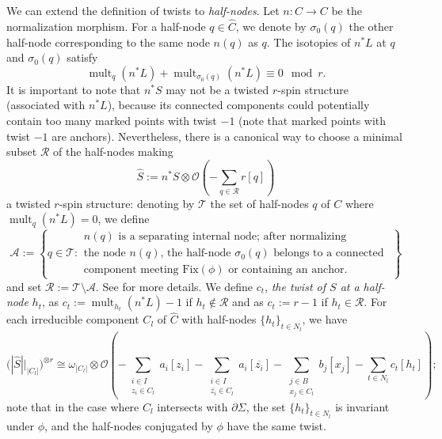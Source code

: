 \documentclass[11pt,a4paper]{article}
\theoremstyle{definition}
\theoremstyle{remark}
\numberwithin{equation}{section}
\begin{document}
We can extend the definition of twists to \textit{half-nodes}. Let $n: \widehat{C} \to C$ be the normalization morphism. For a half-node $q\in \widehat{C}$, we denote by $\sigma_0(q)$ the other half-node corresponding to the same node $n(q)$ as $q$. The isotopies of $n^*L$ at $q$ and $\sigma_0(q)$ satisfy $$\operatorname{mult}_{q}(n^*L)+\operatorname{mult}_{\sigma_0(q)}(n^*L)\equiv0 \mod r.$$ It is important to note that $n^*S$ may not be a twisted $r$-spin structure (associated with $n^*L$), because its connected components could potentially contain too many marked points with twist $-1$ (note that marked points with twist $-1$ are anchors).  Nevertheless, there is a canonical way to choose a minimal subset $\mathcal{R}$ of the half-nodes making
\begin{equation}
\label{eq normalize S}
\widehat{S}:= n^* S \otimes {\mathcal{O}}\left(-\sum_{q \in \mathcal{R}} r [q]\right)
\end{equation}
a twisted $r$-spin structure: denoting by $\mathcal T$ the set of half-nodes $q$ of $C$ where $\operatorname{mult}_{q}(n^*L)=0$, we define
\begin{equation*}
\mathcal A:= \left\{q \in \mathcal T\colon 
\begin{array}{ccc}
    \text{$n(q)$ is a separating internal node; after normalizing}\\
    \text{the node $n(q)$, the half-node $\sigma_0(q)$ belongs to a connected }\\
    \text{component meeting $\text{Fix}(\phi)$ or containing an anchor.}
\end{array} \right\}
\end{equation*}
and set $\mathcal R := \mathcal T \setminus \mathcal A$. See \cite[Section 2.3]{BCT1} for more details. 
We define $c_t$, \textit{the twist of $S$ at a half-node} $h_t$, as $c_t:=\operatorname{mult}_{h_t}(n^*L)-1$ if $h_t \notin \mathcal R$ and as $c_t:=r-1$ if $h_t\in \mathcal R$.
For each irreducible component $C_l$ of $\widehat{C}$ with half-nodes $\{h_t\}_{t \in N_l}$, we have
$$\bigg(|\widehat{S}|\big|_{|C_l|}\bigg)^{\otimes r} \cong \omega_{|C_l|} \otimes {\mathcal{O}}\left(-\sum_{\substack{i \in I\\z_i\in C_l}} a_i[z_i] - \sum_{\substack{i \in I\\ \overline{z_i}\in C_l}} a_i [\overline{z_i}] - \sum_{\substack{j \in B\\ x_j\in C_l}} b_j[x_j] - \sum_{t \in N_l} c_t [h_t]\right);$$
note that in the case where $C_l$ intersects with $\partial \Sigma$, the set $\{h_t\}_{t \in N_l}$ is invariant under $\phi$, and the half-nodes conjugated by $\phi$ have the same twist.
\end{document}
